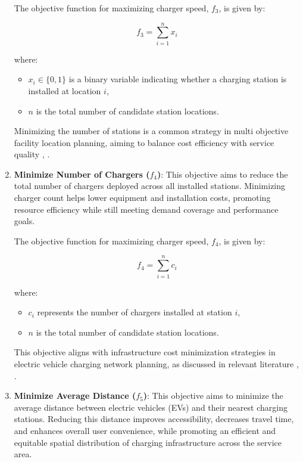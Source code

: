 \begin{enumerate}
    The objective function for maximizing charger speed, \( f_3 \), is given by:

    \[
    f_3 = \sum_{i=1}^{n} x_i
    \]

    where:
    \begin{itemize}
        \item \( x_i \in \{0,1\} \) is a binary variable indicating whether a charging station is installed at location \( i \),
        \item \( n \) is the total number of candidate station locations.
    \end{itemize}

   Minimizing the number of stations is a common strategy in multi objective facility location planning, aiming to balance cost efficiency with service quality \cite{A multi-objective optimization model for electric vehicle charging station location planning}, \cite{Multi-objective evolutionary algorithms for solving the electric vehicle charging station infrastructure problem}.

    
    \item \textbf{Minimize Number of Chargers ($f_4$)}: This objective aims to reduce the total number of chargers deployed across all installed stations. Minimizing charger count helps lower equipment and installation costs, promoting resource efficiency while still meeting demand coverage and performance goals.

    The objective function for maximizing charger speed, \( f_4 \), is given by:
    
    \[
    f_4 = \sum_{i=1}^{n} c_i
    \]

    where:
    \begin{itemize}
        \item \( c_i \) represents the number of chargers installed at station \( i \),
        \item \( n \) is the total number of candidate station locations.
    \end{itemize}

    This objective aligns with infrastructure cost minimization strategies in electric vehicle charging network planning, as discussed in relevant literature \cite{A multi-objective optimization model for electric vehicle charging station location planning}, \cite{Multi-objective evolutionary algorithms for solving the electric vehicle charging station infrastructure problem}.

    \item \textbf{Minimize Average Distance ($f_5$)}: This objective aims to minimize the average distance between electric vehicles (EVs) and their nearest charging stations. Reducing this distance improves accessibility, decreases travel time, and enhances overall user convenience, while promoting an efficient and equitable spatial distribution of charging infrastructure across the service area.


\end{enumerate}
